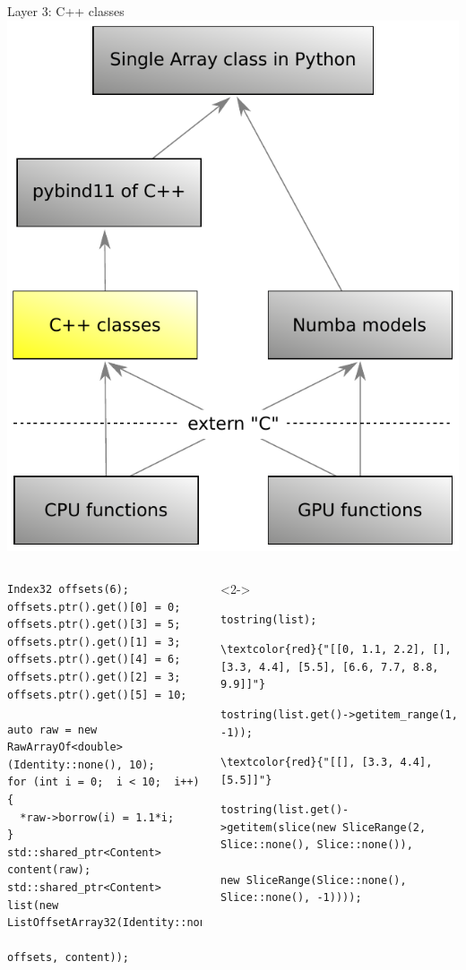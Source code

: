 \documentclass[aspectratio=169]{beamer}
\begin{document}
\begin{frame}[fragile]{Layer 3: C++ classes}
\vspace{0.5 cm}
\hfill\mbox{\includegraphics[height=4 cm]{awkward-1-0-layers-mini-cpp.pdf}\hspace{-0.75 cm}}

\scriptsize
\vspace{-4.45 cm}
\begin{columns}
\begin{verbatim}
Index32 offsets(6);
offsets.ptr().get()[0] = 0;    offsets.ptr().get()[3] = 5;
offsets.ptr().get()[1] = 3;    offsets.ptr().get()[4] = 6;
offsets.ptr().get()[2] = 3;    offsets.ptr().get()[5] = 10;

auto raw = new RawArrayOf<double>(Identity::none(), 10);
for (int i = 0;  i < 10;  i++) {
  *raw->borrow(i) = 1.1*i;
}
std::shared_ptr<Content> content(raw);
std::shared_ptr<Content> list(new ListOffsetArray32(Identity::none(),
                                                    offsets, content));
\end{verbatim}
\begin{uncoverenv}<2->
\begin{verbatim}
tostring(list);
\end{verbatim}

\vspace{-0.25 cm}
\begin{Verbatim}[commandchars=\\\{\}]
\textcolor{red}{"[[0, 1.1, 2.2], [], [3.3, 4.4], [5.5], [6.6, 7.7, 8.8, 9.9]]"}
\end{Verbatim}
\begin{verbatim}
tostring(list.get()->getitem_range(1, -1));
\end{verbatim}

\vspace{-0.25 cm}
\begin{Verbatim}[commandchars=\\\{\}]
\textcolor{red}{"[[], [3.3, 4.4], [5.5]]"}
\end{Verbatim}
\begin{verbatim}
tostring(list.get()->getitem(slice(new SliceRange(2, Slice::none(), Slice::none()),
                                   new SliceRange(Slice::none(), Slice::none(), -1))));
\end{verbatim}


\end{uncoverenv}
\end{columns}
\end{frame}
\end{document}
